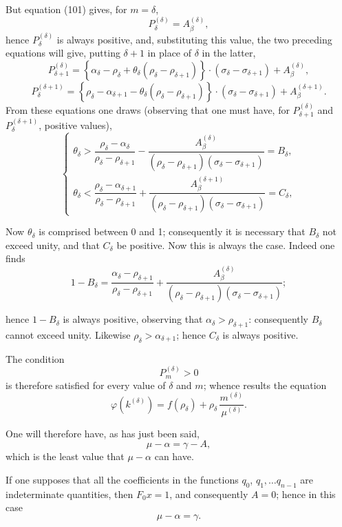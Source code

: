 \documentclass{article}
\begin{document}
But equation (101) gives, for $m = \delta$,
\[ P_\delta^{(\delta)} = A_\beta^{(\delta)}, \]
hence $P_\delta^{(\delta)}$ is always positive, and, substituting this value, the two preceding equations will give, putting $\delta+1$ in place of $\delta$ in the latter,
\[ P_{\delta+1}^{(\delta)} = \left\{\alpha_\delta - \rho_\delta + \theta_\delta(\rho_\delta-\rho_{\delta+1})\right\} \cdot (\sigma_\delta-\sigma_{\delta+1}) + A_\beta^{(\delta)}, \]
\[ P_\delta^{(\delta+1)} = \left\{\rho_\delta - \alpha_{\delta+1} - \theta_\delta(\rho_\delta-\rho_{\delta+1})\right\} \cdot (\sigma_\delta-\sigma_{\delta+1}) + A_\beta^{(\delta+1)}. \]
From these equations one draws (observing that one must have, for $P_{\delta+1}^{(\delta)}$ and $P_\delta^{(\delta+1)}$, positive values),
\[ \begin{cases}
\theta_\delta > \dfrac{\rho_\delta-\alpha_\delta}{\rho_\delta-\rho_{\delta+1}} - \dfrac{A_\beta^{(\delta)}}{(\rho_\delta-\rho_{\delta+1})(\sigma_\delta-\sigma_{\delta+1})} = B_\delta, \\
\theta_\delta < \dfrac{\rho_\delta-\alpha_{\delta+1}}{\rho_\delta-\rho_{\delta+1}} + \dfrac{A_\beta^{(\delta+1)}}{(\rho_\delta-\rho_{\delta+1})(\sigma_\delta-\sigma_{\delta+1})} = C_\delta,
\end{cases} \tag{103} \]

Now $\theta_\delta$ is comprised between 0 and 1; consequently it is necessary that $B_\delta$ not exceed unity, and that $C_\delta$ be positive. Now this is always the case. Indeed one finds
\[ 1 - B_\delta = \frac{\alpha_\delta - \rho_{\delta+1}}{\rho_\delta-\rho_{\delta+1}} + \frac{A_\beta^{(\delta)}}{(\rho_\delta-\rho_{\delta+1})(\sigma_\delta-\sigma_{\delta+1})}; \]

hence $1-B_\delta$ is always positive, observing that $\alpha_\delta > \rho_{\delta+1}$: consequently $B_\delta$ cannot exceed unity. Likewise $\rho_\delta > \alpha_{\delta+1}$; hence $C_\delta$ is always positive.

The condition
\[ P_m^{(\delta)} > 0 \]
is therefore satisfied for every value of $\delta$ and $m$; whence results the equation
\[ \varphi(k^{(\delta)}) = f(\rho_\delta) + \rho_\delta\,\frac{m^{(\delta)}}{\mu^{(\delta)}}. \]

One will therefore have, as has just been said,
\[ \mu - \alpha = \gamma - A, \tag{104} \]
which is the least value that $\mu-\alpha$ can have.

If one supposes that all the coefficients in the functions $q_0$,
$q_1, \ldots q_{n-1}$ are indeterminate quantities, then $F_0 x = 1$, and consequently $A = 0$; hence in this case
\[ \mu - \alpha = \gamma. \tag{105} \]
\end{document}
